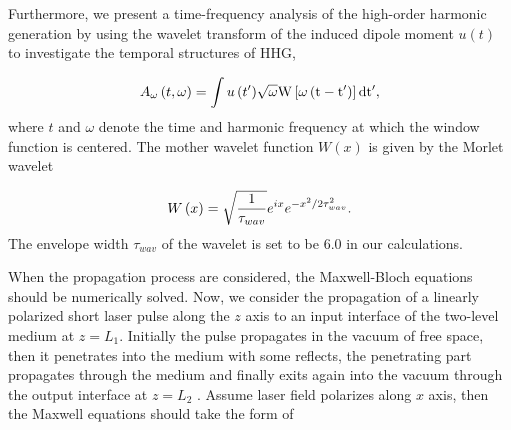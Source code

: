 \documentclass[10pt,letterpaper]{article}
\begin{document}
Furthermore, we present a time-frequency analysis of the high-order harmonic generation by using the wavelet transform of the induced dipole moment ${u}\left( t \right)$ to investigate the temporal structures of HHG,

\begin{equation}
{A_\omega }\left( {t,\omega } \right) = \int {{u}\left( {t'} \right)} \sqrt \omega  \rm{W}\left[ {\omega \left( {t - t'} \right)} \right]{\rm{d}}t',
\label{eq8}
\end{equation}
where $ t $ and $ \omega $ denote the time and harmonic frequency at which the window function is centered. The mother wavelet function $ {W}(x) $ is given by the Morlet wavelet \cite{CuiNi2010NJP-wavelet,MyOE2013,TongXiaoMin2000PRA-Wavelet}

\begin{equation}
{{W}}\left( x \right) = \sqrt {\frac{{\rm{1}}}{{{\tau _{wav}}}}} {e^{ix}}{e^{ - {x^2}/2\tau _{wav}^2}}.
\label{eq9}
\end{equation}
The envelope width $ \tau_{wav} $ of the wavelet is set to be 6.0 in our calculations.

When the propagation process are considered, the Maxwell-Bloch equations should be numerically solved. Now, we consider the propagation of a linearly polarized short laser pulse along the $ z $ axis to an input interface of the two-level medium at $ z=L_{1} $. Initially the pulse propagates in the vacuum of free space, then it penetrates into the medium with some reflects, the penetrating part propagates through the medium and finally exits again into the vacuum through the output interface at $ z=L_{2} $ \cite{Kalosha-Two-Level-PRL-1999}. Assume laser field polarizes along  $ x $ axis, then the Maxwell equations should take the form of
\end{document}
